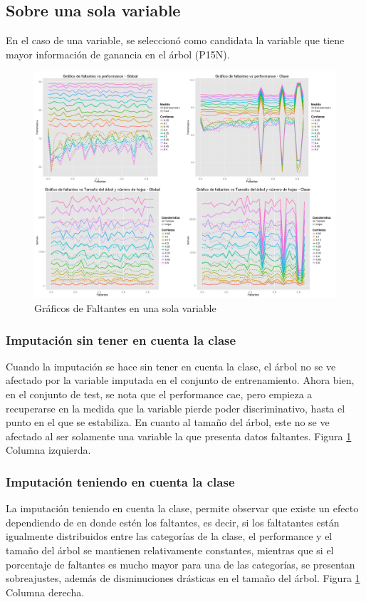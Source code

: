 \documentclass[]{article}
\begin{document}
\subsection{Sobre una sola variable}
En el caso de una variable, se seleccionó como candidata la variable que tiene mayor información de ganancia en el árbol (P15N).

\begin{figure}[H]
	\includegraphics[scale = 0.27]{2_1_Unic_Col}
	\caption[Faltantes Unica variable]{Gráficos de Faltantes en una sola variable}
	\label{2.P2Unic_Var}
\end{figure}


\subsubsection{Imputación sin tener en cuenta la clase}
Cuando la imputación se hace sin tener en cuenta la clase, el árbol no se ve afectado por la variable imputada en el conjunto de entrenamiento. Ahora bien, en el conjunto de test, se nota que el performance cae, pero empieza a recuperarse en la medida que la variable pierde poder discriminativo, hasta el punto en el que se estabiliza. En cuanto al tamaño del árbol, este no se ve afectado al ser solamente una variable la que presenta datos faltantes. Figura \ref{2.P2Unic_Var} Columna izquierda.

\subsubsection{Imputación teniendo en cuenta la clase}
La imputación teniendo en cuenta la clase, permite observar que existe un efecto dependiendo de en donde estén los faltantes, es decir, si los faltatantes están igualmente distribuidos entre las categorías de la clase, el performance y el tamaño del árbol se mantienen relativamente constantes, mientras que si el porcentaje de faltantes es mucho mayor para una de las categorías, se presentan sobreajustes, además de disminuciones drásticas en el tamaño del árbol.
Figura \ref{2.P2Unic_Var} Columna derecha.
\end{document}
